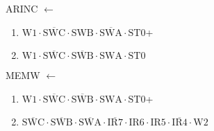 \documentclass[UTF8]{ctexart}
\begin{document}
ARINC $\leftarrow$
\begin{enumerate}[\indent\indent]
	\item $\text{W1} \cdot \overline{\text{SWC}} \cdot \text{SWB} \cdot \overline{\text{SWA}} \cdot \text{ST0}$+
	\item $\text{W1} \cdot \overline{\text{SWC}} \cdot \overline{\text{SWB}} \cdot \text{SWA} \cdot \text{ST0}$
\end{enumerate}

MEMW $\leftarrow$
\begin{enumerate}[\indent\indent]
	\item $\text{W1} \cdot \overline{\text{SWC}} \cdot \overline{\text{SWB}} \cdot \text{SWA} \cdot \text{ST0}$+
	\item $\overline{\text{SWC}} \cdot\overline{\text{SWB}}\cdot \overline{\text{SWA}} \cdot \overline{\text{IR7}} \cdot \text{IR6} \cdot \text{IR5} \cdot \overline{\text{IR4}} \cdot \text{W2}$
\end{enumerate}
\end{document}
